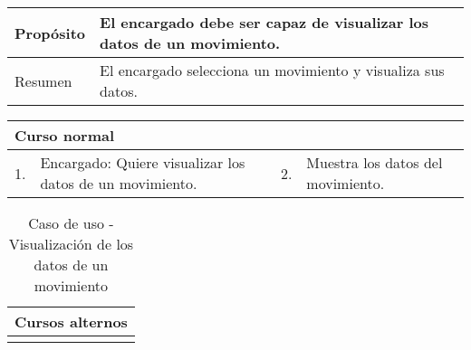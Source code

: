 \begin{table}[H]
	\centering
	\begin{tabular}{| m{} | m{} | m{} | m{} |}
		\hline
		Propósito & \multicolumn{3}{m{0.67\textwidth}|}{El encargado debe ser capaz de visualizar los datos de un movimiento.}  \\ 
		\hline
		Resumen & \multicolumn{3}{m{0.67\textwidth}|}{El encargado selecciona un movimiento y visualiza sus datos.} \\ 
		\hline
	\end{tabular}
\end{table}


\begin{table}[H]
	\centering
	\begin{tabular}{| m{} | m{} | m{} | m{} |}
		\hline
		\multicolumn{4}{|m{0.9\textwidth}|}{Curso normal}     \\ 
		\hline
		1. & Encargado: Quiere visualizar los datos de un movimiento. & 2. &  Muestra los datos del movimiento.  \\ 
		\hline
	\end{tabular}
\end{table}

\begin{table}[H]
	\centering
	\begin{tabular}{| m{} | m{} | m{} | m{} |}
		\hline
		\multicolumn{4}{|m{0.9\textwidth}|}{Cursos alternos}     \\ 
		\hline
		& \multicolumn{3}{m{0.67\textwidth}|}{} \\ 
		\hline
	\end{tabular}
	\caption{Caso de uso - Visualización de los datos de un movimiento}
\end{table}

\newpage


